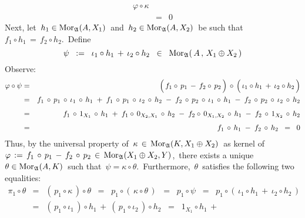 \begin{enumerate}
\begin{eqnarray*}
		\varphi \circ \kappa
	\\
	& = &
		0
	\end{eqnarray*}
	Next, let
	\,$h_{1} \in \textnormal{Mor}_{\mathfrak{A}}(A,X_{1})$\,
	and
	\,$h_{2} \in \textnormal{Mor}_{\mathfrak{A}}(A,X_{2})$\,
	be such that
	\,$f_{1} \circ h_{1} \,=\, f_{2} \circ h_{2}$.\,
	Define
	{\color{red}
	\begin{equation*}
	\psi
	\;\; := \;\;
		\iota_{1}\circ h_{1}\,+\,\iota_{2}\circ h_{2}
	\;\; \in \;\;
		\textnormal{Mor}_{\mathfrak{A}}(\,A\,,\,X_{1} \oplus X_{2}\,)
	\end{equation*}
	}
	Observe:
	\begin{eqnarray*}
	\varphi \circ \psi
	& = &
		\left(\,f_{1} \circ\, p_{1} \,\overset{{\color{white}.}}{-}\, f_{2} \circ\, p_{2}\,\right)
		\,\circ\,
		\left(\,\iota_{1} \circ h_{1} \,\overset{{\color{white}.}}{+}\, \iota_{2} \circ h_{2}\,\right)
	\\
	& = &
		f_{1} \,\circ\, p_{1} \,\circ\, \iota_{1} \,\circ\, h_{1}
		\; + \;
		f_{1} \,\circ\, p_{1} \,\circ\, \iota_{2} \,\circ\, h_{2}
		\; - \;
		f_{2} \,\circ\, p_{2} \,\circ\, \iota_{1} \,\circ\, h_{1}
		\; - \;
		f_{2} \,\circ\, p_{2} \,\circ\, \iota_{2} \,\circ\, h_{2}
	\\
	& \overset{{\color{white}1}}{=} &
		f_{1} \,\circ\, 1_{X_{1}} \,\circ\, h_{1}
		\; + \;
		f_{1} \circ\, 0_{X_{2},X_{1}} \,\circ\, h_{2}
		\; - \;
		f_{2} \circ\, 0_{X_{1},X_{2}} \,\circ\, h_{1}
		\; - \;
		f_{2} \,\circ\, 1_{X_{2}} \,\circ\, h_{2}
	\\
	& \overset{{\color{white}1}}{=} &
		f_{1} \,\circ\, h_{1}
		\; - \;
		f_{2} \,\circ\, h_{2}
	\;\; = \;\;
		0
	\end{eqnarray*}
	Thus, by the universal property of
	\,$\kappa \,\in\, \textnormal{Mor}_{\mathfrak{A}}(K,X_{1} \oplus X_{2})$\,
	as kernel of
	\,$\varphi\,:=\,f_{1}\,\circ\,p_{1}\,-\,f_{2}\,\circ\,p_{2}\,\in\,\textnormal{Mor}_{\mathfrak{A}}(X_{1} \oplus X_{2},Y)$,\,
	there exists a unique
	\,$\theta \in \textnormal{Mor}_{\mathfrak{A}}(A,K)$\,
	such that
	\,$\psi = \kappa \circ \theta$.\,
	Furthermore, \,$\theta$\, satisfies the following two equalities:
	\begin{eqnarray*}
	\pi_{1} \circ \theta
	& = &
		(\,p_{1} \circ \kappa\,) \circ \theta
	\;\; = \;\;
		p_{1} \circ (\,\kappa \circ \theta\,)
	\;\; = \;\;
		p_{1} \circ \psi
	\;\; = \;\;
		p_{1} \circ (\,\iota_{1}\circ h_{1}\,+\,\iota_{2}\circ h_{2}\,)
	\\
	& = &
		(\,p_{1} \circ \iota_{1}\,) \circ h_{1}
		\,+\
		(\,p_{1} \circ \iota_{2}\,) \circ h_{2}
	\;\; = \;\;
		1_{X_{1}} \circ h_{1}
		\,+\

\end{eqnarray*}
\end{enumerate}
